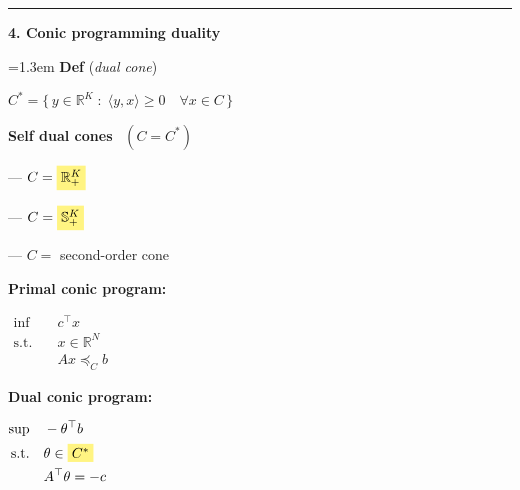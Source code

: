 \documentclass[10pt]{article}
\newcommand{\beat}[2]{%
  \par\bigskip\vspace{4pt}
  {\color{ruleink}\rule{\textwidth}{1pt}}\par\nobreak\vspace{4pt}
  {\large\bfseries #1.\; #2}\par\nobreak\vspace{6pt}}
\newenvironment{board}{%
  \par\vspace{4pt}
  \begingroup\leftskip=1.3em\relax\parskip=2pt\relax}{%
  \par\endgroup\vspace{4pt}}
\newcommand{\coneleq}{\mathrel{\preceq_{\scriptscriptstyle C}}}
\newcommand{\hl}[1]{\colorbox{hlyel}{$#1$}}
\begin{document}
\beat{4}{Conic programming duality}
\begin{board}
\textbf{Def} (\emph{dual cone})
\vspace{4pt}

\quad $C^* = \big\{\, y \in \mathbb{R}^K \;:\; \langle y, x \rangle \ge 0 \quad \forall x \in C \,\big\}$
\vspace{14pt}

\textbf{Self dual cones} \ $(C = C^*)$
\vspace{5pt}

\quad --- $C = \hl{\mathbb{R}^K_+}$
\vspace{5pt}

\quad --- $C = \hl{\mathbb{S}^K_+}$
\vspace{5pt}

\quad --- $C = $ \colorbox{hlyel}{second-order cone}
\vspace{16pt}

\textbf{Primal conic program:}
\vspace{2pt}

\begin{center}
$\begin{aligned}
  \inf\quad & c^{\top}x \\
  \text{s.t.}\quad & x \in \mathbb{R}^N \\
                   & Ax \coneleq b
\end{aligned}$
\end{center}
\vspace{12pt}

\textbf{Dual conic program:}
\vspace{2pt}

\begin{center}
$\begin{aligned}
  \sup\quad & -\theta^{\top}b \\
  \text{s.t.}\quad & \theta \in \hl{C^*} \\
                   & A^{\top}\theta = -c
\end{aligned}$
\end{center}
\end{board}
\end{document}
